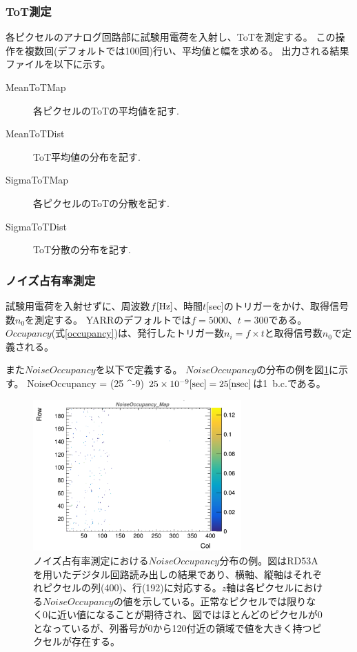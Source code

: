 \subsubsection{ToT測定}
各ピクセルのアナログ回路部に試験用電荷を入射し、ToTを測定する。
この操作を複数回(デフォルトでは100回)行い、平均値と幅を求める。
出力される結果ファイルを以下に示す。
\begin{description}
  \item [MeanToTMap] 各ピクセルのToTの平均値を記す.
  \item [MeanToTDist] ToT平均値の分布を記す. 
  \item [SigmaToTMap] 各ピクセルのToTの分散を記す.
  \item [SigmaToTDist] ToT分散の分布を記す.
\end{description}

\subsubsection{ノイズ占有率測定}
試験用電荷を入射せずに、周波数$f[{\rm Hz}]$、時間$t$[sec]のトリガーをかけ、取得信号数$n_0$を測定する。
YARRのデフォルトでは$f=5000、t=300$である。
$Occupancy$(式\ref{occupancy})は、発行したトリガー数$n_i=f \times t$と取得信号数$n_0$で定義される。

また$NoiseOccupancy$を以下で定義する。
$NoiseOccupancy$の分布の例を図\ref{noise_occ}に示す。
\bbb
NoiseOccupancy =  \times (25 ^{-9})
\eee
$25 \times 10^{-9}[{\rm sec}]=25[{\rm nsec}]$は1~b.c.である。

\begin{figure}[bpt]\centering
\includegraphics[width=8cm]{./noise_occ.png}
\caption[ノイズ占有率測定における$NoiseOccupancy$分布の例。]{ノイズ占有率測定における$NoiseOccupancy$分布の例。図はRD53Aを用いたデジタル回路読み出しの結果であり、横軸、縦軸はそれぞれピクセルの列(400)、行(192)に対応する。$z$軸は各ピクセルにおける$NoiseOccupancy$の値を示している。正常なピクセルでは限りなく0に近い値になることが期待され、図ではほとんどのピクセルが0となっているが、列番号が0から120付近の領域で値を大きく持つピクセルが存在する。}
\label{noise_occ}
\end{figure}

